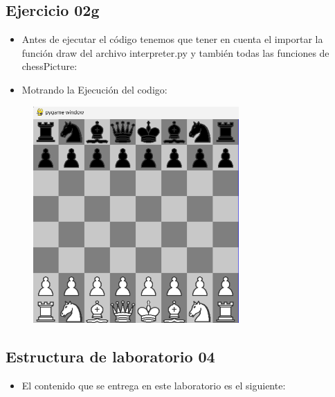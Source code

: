 \documentclass{article}
\begin{document}
	\subsection{Ejercicio 02g}
	\begin{itemize}	
		\item Antes de ejecutar el código tenemos que tener en cuenta el importar la función draw del archivo interpreter.py y también todas las funciones de chessPicture:
	\end{itemize}	
	
		

	\begin{itemize}	
		\item Motrando la Ejecución del codigo:
	\end{itemize}	
	
	\begin{figure}[H]
		\centering
		\includegraphics[width=0.7\textwidth,keepaspectratio]{img/Ejercicio2g.png}
	\end{figure}
		
	\subsection{Estructura de laboratorio 04}
	\begin{itemize}	
		\item El contenido que se entrega en este laboratorio es el siguiente:
	\end{itemize}
	
\end{document}
